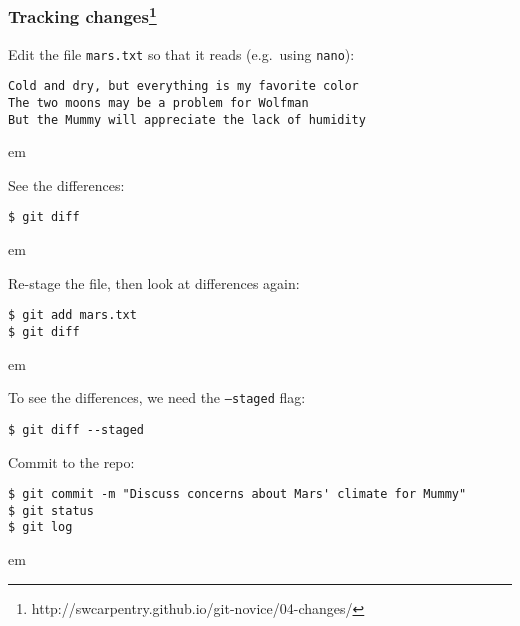 \documentclass{beamer}
\begin{document}
\begin{frame}
{\begin{minipage}{\textwidth}
  \end{minipage}
  }

\end{frame}

\begin{frame}[fragile]
  \frametitle{Tracking changes\footnote{http://swcarpentry.github.io/git-novice/04-changes/}}

Edit the file \texttt{mars.txt} so that it reads (e.g.~using \texttt{nano}):
\begin{verbatim}
Cold and dry, but everything is my favorite color
The two moons may be a problem for Wolfman
But the Mummy will appreciate the lack of humidity
\end{verbatim}
 em
\pause

See the differences:
\begin{verbatim}
$ git diff
\end{verbatim}
 em
\pause

Re-stage the file, then look at differences again:
\begin{verbatim}
$ git add mars.txt
$ git diff
\end{verbatim}
 em
\pause

To see the differences, we need the \texttt{--staged} flag:
\begin{verbatim}
$ git diff --staged
\end{verbatim}

\end{frame}

\begin{frame}[fragile]

Commit to the repo:
\begin{verbatim}
$ git commit -m "Discuss concerns about Mars' climate for Mummy"
$ git status
$ git log
\end{verbatim}
 em
\pause

\end{frame}
\end{document}
